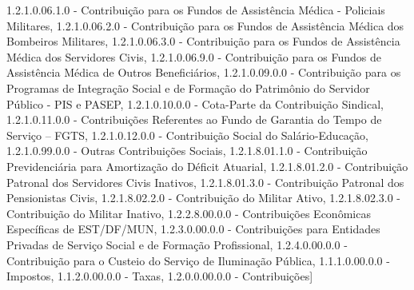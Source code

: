 \documentclass[
  12,
  dvipsnames]{article}
\newenvironment{Shaded}{\begin{snugshade}}{\end{snugshade}}
\newcommand{\NormalTok}[1]{#1}
\newcommand{\StringTok}[1]{\textcolor[rgb]{0.31,0.60,0.02}{#1}}
\begin{document}
\begin{Shaded}
\begin{Highlighting}[]
            \StringTok{\textquotesingle{}1.2.1.0.06.1.0 {-} Contribuição para os Fundos de Assistência Médica {-} Policiais Militares\textquotesingle{}}\NormalTok{,}
            \StringTok{\textquotesingle{}1.2.1.0.06.2.0 {-} Contribuição para os Fundos de Assistência Médica dos Bombeiros Militares\textquotesingle{}}\NormalTok{,}
            \StringTok{\textquotesingle{}1.2.1.0.06.3.0 {-} Contribuição para os Fundos de Assistência Médica dos Servidores Civis\textquotesingle{}}\NormalTok{,}
            \StringTok{\textquotesingle{}1.2.1.0.06.9.0 {-} Contribuição para os Fundos de Assistência Médica de Outros Beneficiários\textquotesingle{}}\NormalTok{,}
            \StringTok{\textquotesingle{}1.2.1.0.09.0.0 {-} Contribuição para os Programas de Integração Social e de Formação do Patrimônio do Servidor Público {-} PIS e PASEP\textquotesingle{}}\NormalTok{,}
            \StringTok{\textquotesingle{}1.2.1.0.10.0.0 {-} Cota{-}Parte da Contribuição Sindical\textquotesingle{}}\NormalTok{,}
            \StringTok{\textquotesingle{}1.2.1.0.11.0.0 {-} Contribuições Referentes ao Fundo de Garantia do Tempo de Serviço – FGTS\textquotesingle{}}\NormalTok{,}
            \StringTok{\textquotesingle{}1.2.1.0.12.0.0 {-} Contribuição Social do Salário{-}Educação\textquotesingle{}}\NormalTok{,}
            \StringTok{\textquotesingle{}1.2.1.0.99.0.0 {-} Outras Contribuições Sociais\textquotesingle{}}\NormalTok{,}
            \StringTok{\textquotesingle{}1.2.1.8.01.1.0 {-} Contribuição Previdenciária para Amortização do Déficit Atuarial\textquotesingle{}}\NormalTok{,}
            \StringTok{\textquotesingle{}1.2.1.8.01.2.0 {-} Contribuição Patronal dos Servidores Civis Inativos\textquotesingle{}}\NormalTok{,}
            \StringTok{\textquotesingle{}1.2.1.8.01.3.0 {-} Contribuição Patronal dos Pensionistas Civis\textquotesingle{}}\NormalTok{,}
            \StringTok{\textquotesingle{}1.2.1.8.02.2.0 {-} Contribuição do Militar Ativo\textquotesingle{}}\NormalTok{,}
            \StringTok{\textquotesingle{}1.2.1.8.02.3.0 {-} Contribuição do Militar Inativo\textquotesingle{}}\NormalTok{,}
            \StringTok{\textquotesingle{}1.2.2.8.00.0.0 {-} Contribuições Econômicas Específicas de EST/DF/MUN\textquotesingle{}}\NormalTok{,}
            \StringTok{\textquotesingle{}1.2.3.0.00.0.0 {-} Contribuições para Entidades Privadas de Serviço Social e de Formação Profissional\textquotesingle{}}\NormalTok{,}
            \StringTok{\textquotesingle{}1.2.4.0.00.0.0 {-} Contribuição para o Custeio do Serviço de Iluminação Pública\textquotesingle{}}\NormalTok{,}
            \StringTok{\textquotesingle{}1.1.1.0.00.0.0 {-} Impostos\textquotesingle{}}\NormalTok{,}
            \StringTok{\textquotesingle{}1.1.2.0.00.0.0 {-} Taxas\textquotesingle{}}\NormalTok{,}
            \StringTok{\textquotesingle{}1.2.0.0.00.0.0 {-} Contribuições\textquotesingle{}}\NormalTok{]}


\end{Highlighting}
\end{Shaded}
\end{document}
